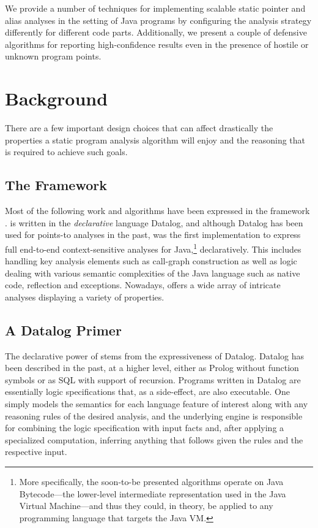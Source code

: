 We provide a number of techniques for implementing scalable static pointer and
alias analyses in the setting of Java programs by configuring the analysis
strategy differently for different code parts. Additionally, we present a
couple of defensive algorithms for reporting high-confidence results even in
the presence of hostile or unknown program points.


\section{Background}

There are a few important design choices that can affect drastically the
properties a static program analysis algorithm will enjoy and the reasoning
that is required to achieve such goals.


\subsection{The \doop{} Framework}

Most of the following work and algorithms have been expressed in the \doop{}
framework \cite{oopsla:2009:Bravenboer}. \doop{} is written in the \emph{declarative} language Datalog, and
although Datalog has been used for points-to analyses in the past, \doop{} was
the first implementation to express full end-to-end context-sensitive analyses
for Java,\footnote{More specifically, the soon-to-be presented algorithms
operate on Java Bytecode---the lower-level intermediate representation used in
the Java Virtual Machine---and thus they could, in theory, be applied to any
programming language that targets the Java VM.} declaratively. This includes
handling key analysis elements such as call-graph construction as well as logic
dealing with various semantic complexities of the Java language such as native
code, reflection and exceptions. Nowadays, \doop{} offers a wide array of
intricate analyses displaying a variety of properties.


\subsection{A Datalog Primer}
\label{sec:intro:datalog}

The declarative power of \doop{} stems from the expressiveness of Datalog.
Datalog has been described in the past, at a higher level, either as Prolog
without function symbols or as SQL with support of recursion. Programs written
in Datalog are essentially logic specifications that, as a side-effect, are
also executable. One simply models the semantics for each language feature of
interest along with any reasoning rules of the desired analysis, and the
underlying engine is responsible for combining the logic specification with
input facts and, after applying a specialized computation, inferring anything
that follows given the rules and the respective input.

